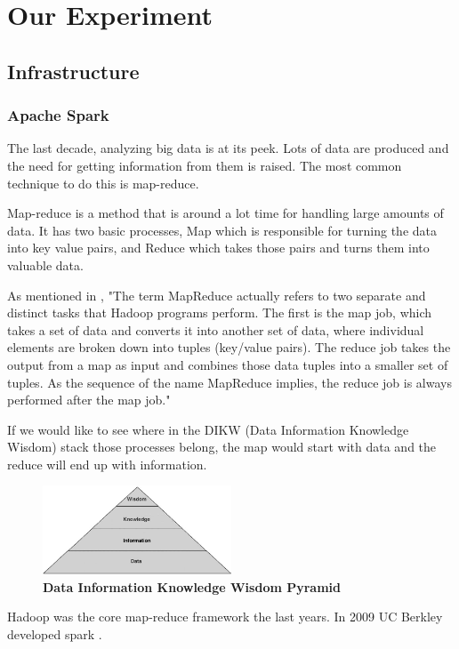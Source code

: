\section{Our Experiment}
\subsection{Infrastructure}
\subsubsection{Apache Spark}
The last decade, analyzing big data is at its peek. Lots of data are produced and the need for getting information from them is raised. The most common technique to do this is map-reduce.

Map-reduce is a method that is around a lot time for handling large amounts of data. It has two basic processes, Map which is responsible for turning the data into key value pairs, and Reduce which takes those pairs and turns them into valuable data.

As mentioned in \cite{ibmMapReduce:5}, "The term MapReduce actually refers to two separate and distinct tasks that Hadoop programs perform. The first is the map job, which takes a set of data and converts it into another set of data, where individual elements are broken down into tuples (key/value pairs). The reduce job takes the output from a map as input and combines those data tuples into a smaller set of tuples. As the sequence of the name MapReduce implies, the reduce job is always performed after the map job."

If we would like to see where in the DIKW (Data Information Knowledge Wisdom) stack those processes belong, the map would start with data and the reduce will end up with information.\\

\begin{figure}[ht]
	\centering
	\includegraphics[width=0.5\textwidth]{images/DIKW.png}
	\caption{\bfseries Data Information Knowledge Wisdom Pyramid \cite{TheWisdomHierachy:7}}
	\label{dikw}
\end{figure}

Hadoop was the core map-reduce framework the last years. In 2009 UC Berkley developed spark \cite{DatabricsSpark:8}.

